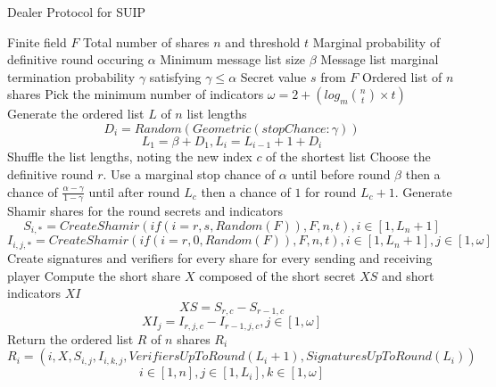 \documentclass{dalcsthesis}
\begin{document}
\begin{algorithm}
  \caption{Dealer Protocol for SUIP}
  \label{alg:SUI_Dealer}
  \begin{algorithmic}[1]
    \INPUT Finite field $F$
    \INPUT Total number of shares $n$ and threshold $t$
    \INPUT Marginal probability of definitive round occuring $\alpha$
    \INPUT Minimum message list size $\beta$
    \INPUT Message list marginal termination probability $\gamma$ satisfying $\gamma \leq \alpha$
    \INPUT Secret value $s$ from $F$
    \OUTPUT Ordered list of $n$ shares
    \STATE Pick the minimum number of indicators $\omega = 2 + (log_m {n \choose t} \times t)$
    \STATE Generate the ordered list $L$ of $n$ list lengths
    	$$D_i = Random(Geometric(stopChance: \gamma))$$
    	$$L_1 = \beta + D_1, L_i = L_{i-1} + 1 + D_i$$
    \STATE Shuffle the list lengths, noting the new index $c$ of the shortest list
    \STATE Choose the definitive round $r$. Use a marginal stop chance of $\alpha$ until before round $\beta$ then a chance of $\frac{\alpha - \gamma}{1 - \gamma}$ until after round $L_c$ then a chance of $1$ for round $L_c + 1$.
    \STATE Generate Shamir shares for the round secrets and indicators
    	$$S_{i,*} = CreateShamir(if(i = r, s, Random(F)), F, n, t), i \in [1, L_n+1]$$
    	$$I_{i,j,*} = CreateShamir(if(i = r, 0, Random(F)), F, n, t), i \in [1, L_n+1], j \in [1, \omega]$$
    \STATE Create signatures and verifiers for every share for every sending and receiving player
    \STATE Compute the short share $X$ composed of the short secret $XS$ and short indicators $XI$
    	$$XS = S_{r,c} - S_{r-1,c}$$
    	$$XI_j = I_{r,j,c} - I_{r-1,j,c}, j \in [1, \omega]$$
    \STATE Return the ordered list $R$ of $n$ shares $R_i$
    	$$R_i = (i, X, S_{i,j}, I_{i,k,j}, VerifiersUpToRound(L_i+1), SignaturesUpToRound(L_i))$$
    	$$i \in [1, n], j \in [1, L_i], k \in [1, \omega]$$
  \end{algorithmic}
\end{algorithm}
\end{document}
